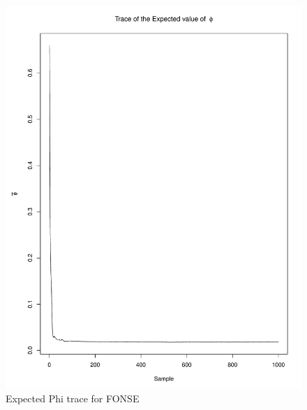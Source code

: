 \documentclass[11pt]{labbook}
\begin{document}
    \begin{figure}
        \centering
        \includegraphics[scale=.65]{FONSE_Plots/2016/July_28/ExpectedPhiTrace}
        \caption{Expected Phi trace for FONSE}
        \label{fig:JULY28_EPHI}
    \end{figure}
\end{document}
